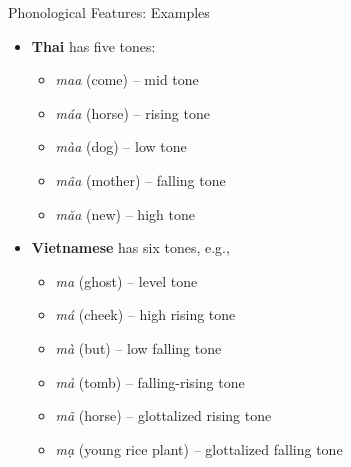 \documentclass{beamer}
\begin{document}
\begin{frame}[allowframebreaks]{Phonological Features: Examples}
\begin{itemize}
\begin{itemize}
\begin{itemize}
                        \end{itemize}
                        \framebreak
                \item \textbf{Thai} has five tones:
                    \begin{itemize}
                        \item \textit{maa} (come) – mid tone
                        \item \textit{máa} (horse) – rising tone
                        \item \textit{màa} (dog) – low tone
                        \item \textit{mâa} (mother) – falling tone
                        \item \textit{măa} (new) – high tone
                    \end{itemize}
                \item \textbf{Vietnamese} has six tones, e.g.,
                    \begin{itemize}
                        \item \textit{ma} (ghost) – level tone
                        \item \textit{má} (cheek) – high rising tone
                        \item \textit{mà} (but) – low falling tone
                        \item \textit{mả} (tomb) – falling-rising tone
                        \item \textit{mã} (horse) – glottalized rising tone
                        \item \textit{mạ} (young rice plant) – glottalized falling tone
                    \end{itemize}
            \end{itemize}
    \end{itemize}
\end{frame}
\end{document}
